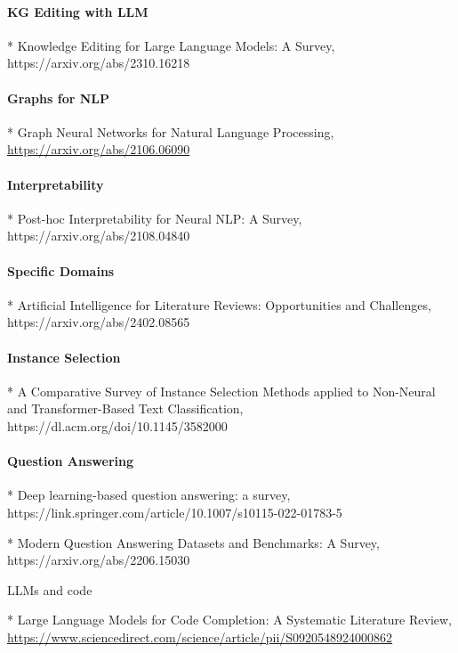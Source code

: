 \paragraph{KG Editing with LLM}

* Knowledge Editing for Large Language Models: A Survey, https://arxiv.org/abs/2310.16218

\paragraph{Graphs for NLP}

* Graph Neural Networks for Natural Language Processing, \url{https://arxiv.org/abs/2106.06090}

\paragraph{Interpretability}

* Post-hoc Interpretability for Neural NLP: A Survey, https://arxiv.org/abs/2108.04840
 
\paragraph{Specific Domains}

* Artificial Intelligence for Literature Reviews: Opportunities and Challenges, https://arxiv.org/abs/2402.08565
 
\paragraph{Instance Selection}

* A Comparative Survey of Instance Selection Methods applied to Non-Neural and Transformer-Based Text Classification, https://dl.acm.org/doi/10.1145/3582000 

\paragraph{Question Answering}

* Deep learning-based question answering: a survey, https://link.springer.com/article/10.1007/s10115-022-01783-5

* Modern Question Answering Datasets and Benchmarks: A Survey, https://arxiv.org/abs/2206.15030

LLMs and code

* Large Language Models for Code Completion: A Systematic Literature Review, 
\url{https://www.sciencedirect.com/science/article/pii/S0920548924000862}
 
